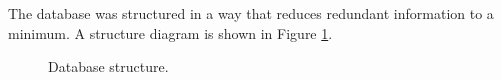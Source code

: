 The database was structured in a way that reduces redundant information to a
minimum. A structure diagram is shown in Figure \ref{fig:dbstructure}.

\begin{figure}[ht]
	\begin{center}
	\end{center}
	\caption{Database structure.}
	\label{fig:dbstructure}
\end{figure}

